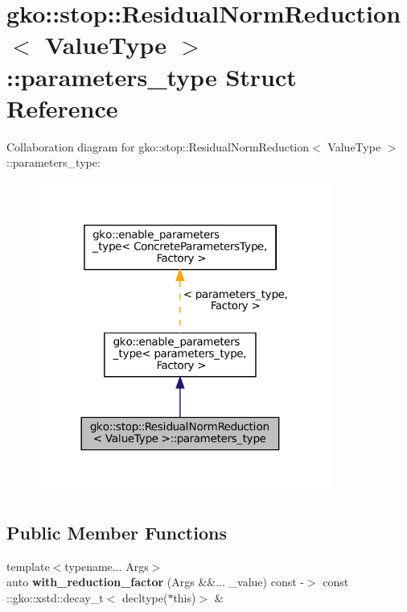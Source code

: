 \hypertarget{structgko_1_1stop_1_1ResidualNormReduction_1_1parameters__type}{}\section{gko\+:\+:stop\+:\+:Residual\+Norm\+Reduction$<$ Value\+Type $>$\+:\+:parameters\+\_\+type Struct Reference}
\label{structgko_1_1stop_1_1ResidualNormReduction_1_1parameters__type}


Collaboration diagram for gko\+:\+:stop\+:\+:Residual\+Norm\+Reduction$<$ Value\+Type $>$\+:\+:parameters\+\_\+type\+:
\nopagebreak
\begin{figure}[H]
\begin{center}
\leavevmode
\includegraphics[width=273pt]{structgko_1_1stop_1_1ResidualNormReduction_1_1parameters__type__coll__graph}
\end{center}
\end{figure}
\subsection*{Public Member Functions}
\begin{DoxyCompactItemize}
\item 
\mbox{\label{structgko_1_1stop_1_1ResidualNormReduction_1_1parameters__type_ad5f6babb4e5868439853792154d372a8}} 
{\footnotesize template$<$typename... Args$>$ }\\auto {\bfseries with\+\_\+reduction\+\_\+factor} (Args \&\&... \+\_\+value) const -\/$>$ const \+::gko\+::xstd\+::decay\+\_\+t$<$ decltype($\ast$this)$>$ \&
\end{DoxyCompactItemize}
